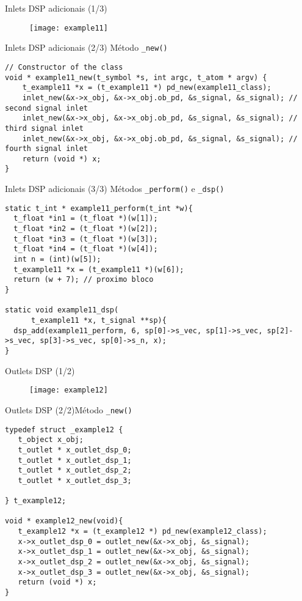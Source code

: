 \begin{frame}{Inlets DSP adicionais (1/3)}
\begin{figure}[h!]
\centering
\texttt{[image: example11]}
\end{figure}
\end{frame}


\begin{frame}[fragile]{Inlets DSP adicionais (2/3)}
{Método \texttt{\_new()}}
\begin{lstlisting}
// Constructor of the class
void * example11_new(t_symbol *s, int argc, t_atom * argv) {
    t_example11 *x = (t_example11 *) pd_new(example11_class);
    inlet_new(&x->x_obj, &x->x_obj.ob_pd, &s_signal, &s_signal); // second signal inlet
    inlet_new(&x->x_obj, &x->x_obj.ob_pd, &s_signal, &s_signal); // third signal inlet
    inlet_new(&x->x_obj, &x->x_obj.ob_pd, &s_signal, &s_signal); // fourth signal inlet
    return (void *) x;
}
\end{lstlisting}
\end{frame}


\begin{frame}[fragile]{Inlets DSP adicionais (3/3)}
{Métodos \texttt{\_perform()} e \texttt{\_dsp()}}
\begin{lstlisting}
static t_int * example11_perform(t_int *w){
  t_float *in1 = (t_float *)(w[1]);
  t_float *in2 = (t_float *)(w[2]);
  t_float *in3 = (t_float *)(w[3]);
  t_float *in4 = (t_float *)(w[4]);
  int n = (int)(w[5]);
  t_example11 *x = (t_example11 *)(w[6]);
  return (w + 7); // proximo bloco
}

static void example11_dsp(
      t_example11 *x, t_signal **sp){
  dsp_add(example11_perform, 6, sp[0]->s_vec, sp[1]->s_vec, sp[2]->s_vec, sp[3]->s_vec, sp[0]->s_n, x);
}
\end{lstlisting}
\end{frame}


\begin{frame}{Outlets DSP (1/2)}
\begin{figure}[h!]
\centering
\texttt{[image: example12]}
\end{figure}
\end{frame}


\begin{frame}[fragile]{Outlets DSP (2/2)}{Método \texttt{\_new()}}
\begin{lstlisting}
typedef struct _example12 {
   t_object x_obj;
   t_outlet * x_outlet_dsp_0;
   t_outlet * x_outlet_dsp_1;
   t_outlet * x_outlet_dsp_2;
   t_outlet * x_outlet_dsp_3;

} t_example12;

void * example12_new(void){
   t_example12 *x = (t_example12 *) pd_new(example12_class);
   x->x_outlet_dsp_0 = outlet_new(&x->x_obj, &s_signal);
   x->x_outlet_dsp_1 = outlet_new(&x->x_obj, &s_signal);
   x->x_outlet_dsp_2 = outlet_new(&x->x_obj, &s_signal);
   x->x_outlet_dsp_3 = outlet_new(&x->x_obj, &s_signal);
   return (void *) x;
}

\end{lstlisting}
\end{frame}



